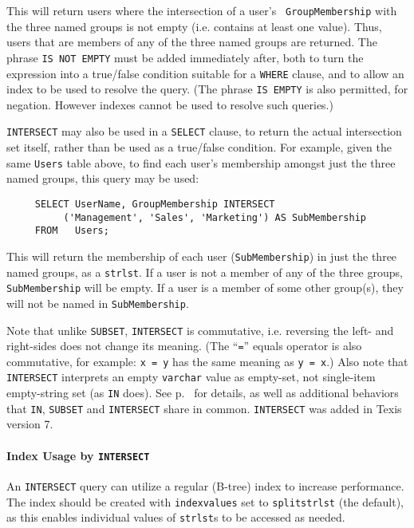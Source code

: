 This will return users where the intersection of a user's {\tt
GroupMembership} with the three named groups is not empty
(i.e. contains at least one value).  Thus, users that are members of
any of the three named groups are returned.  The phrase {\tt IS NOT
EMPTY} must be added immediately after, both to turn the expression
into a true/false condition suitable for a {\tt WHERE} clause, and to
allow an index to be used to resolve the query.  (The phrase {\tt IS
EMPTY} is also permitted, for negation.  However indexes cannot be
used to resolve such queries.)

{\tt INTERSECT} may also be used in a {\tt SELECT} clause, to return
the actual intersection set itself, rather than be used as a
true/false condition.  For example, given the same {\tt Users} table
above, to find each user's membership amongst just the three named
groups, this query may be used:

\begin{verbatim}
     SELECT UserName, GroupMembership INTERSECT
          ('Management', 'Sales', 'Marketing') AS SubMembership
     FROM   Users;
\end{verbatim}

This will return the membership of each user ({\tt SubMembership}) in
just the three named groups, as a \verb`strlst`.  If a user is not a
member of any of the three groups, {\tt SubMembership} will be empty.
If a user is a member of some other group(s), they will not be named
in {\tt SubMembership}.

Note that unlike {\tt SUBSET}, {\tt INTERSECT} is commutative,
i.e. reversing the left- and right-sides does not change its meaning.
(The ``\verb`=`'' equals operator is also commutative, for example:
{\tt x = y} has the same meaning as {\tt y = x}.)  Also note that {\tt
INTERSECT} interprets an empty {\tt varchar} value as empty-set, not
single-item empty-string set (as {\tt IN} does).  See
p.~\pageref{InSubsetIntersectCommonality} for details, as well as
additional behaviors that {\tt IN}, {\tt SUBSET} and {\tt INTERSECT}
share in common.  {\tt INTERSECT} was added in Texis version 7.

\paragraph{Index Usage by {\tt INTERSECT}}

  An {\tt INTERSECT} query can utilize a regular (B-tree) index to
increase performance.  The index should be created with
\verb`indexvalues` set to \verb`splitstrlst` (the default), as this
enables individual values of \verb`strlst`s to be accessed as needed.

